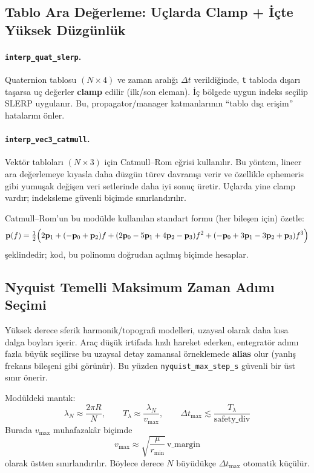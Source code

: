 \subsection*{Tablo Ara Değerleme: Uçlarda Clamp + İçte Yüksek Düzgünlük}
\paragraph{\texttt{interp\_quat\_slerp}.}
Quaternion tablosu \((N\times4)\) ve zaman aralığı \(\Delta t\) verildiğinde, \texttt{t} tabloda dışarı taşarsa uç değerler \textbf{clamp} edilir (ilk/son eleman). İç bölgede uygun indeks seçilip SLERP uygulanır. Bu, propagator/manager katmanlarının ``tablo dışı erişim'' hatalarını önler. 

\paragraph{\texttt{interp\_vec3\_catmull}.}
Vektör tabloları \((N\times3)\) için Catmull--Rom eğrisi kullanılır. Bu yöntem, lineer ara değerlemeye kıyasla daha düzgün türev davranışı verir ve özellikle ephemeris gibi yumuşak değişen veri setlerinde daha iyi sonuç üretir. Uçlarda yine clamp vardır; indeksleme güvenli biçimde sınırlandırılır. 

Catmull--Rom’un bu modülde kullanılan standart formu (her bileşen için) özetle:
\[
\mathbf{p}(f)=\tfrac12\Bigl(
2\mathbf{p}_1 + (-\mathbf{p}_0+\mathbf{p}_2)f +
(2\mathbf{p}_0-5\mathbf{p}_1+4\mathbf{p}_2-\mathbf{p}_3)f^2 +
(-\mathbf{p}_0+3\mathbf{p}_1-3\mathbf{p}_2+\mathbf{p}_3)f^3
\Bigr)
\]
şeklindedir; kod, bu polinomu doğrudan açılmış biçimde hesaplar. 

\subsection*{Nyquist Temelli Maksimum Zaman Adımı Seçimi}
Yüksek derece sferik harmonik/topografi modelleri, uzaysal olarak daha kısa dalga boyları içerir. Araç düşük irtifada hızlı hareket ederken, entegratör adımı fazla büyük seçilirse bu uzaysal detay zamansal örneklemede \textbf{alias} olur (yanlış frekans bileşeni gibi görünür). Bu yüzden \texttt{nyquist\_max\_step\_s} güvenli bir üst sınır önerir. 

Modüldeki mantık:
\[
\lambda_N \approx \frac{2\pi R}{N},\qquad
T_\lambda \approx \frac{\lambda_N}{v_{\max}},\qquad
\Delta t_{\max} \lesssim \frac{T_\lambda}{\text{safety\_div}}
\]
Burada \(v_{\max}\) muhafazakâr biçimde
\[
v_{\max} \approx \sqrt{\frac{\mu}{r_{\min}}}\,\text{v\_margin}
\]
olarak üstten sınırlandırılır. Böylece derece \(N\) büyüdükçe \(\Delta t_{\max}\) otomatik küçülür. 

